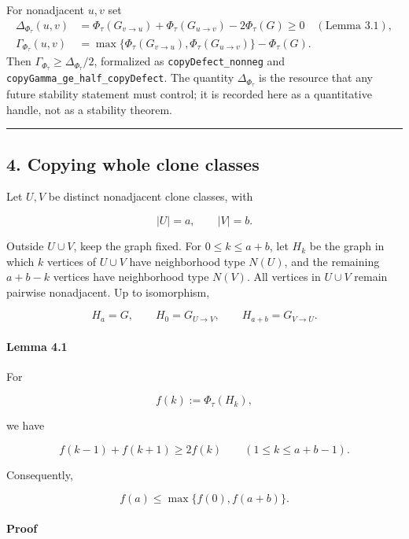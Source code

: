 \documentclass[
  american,
  11pt,
  a4paper,
]{article}
\begin{document}
For nonadjacent \(u,v\) set
\[
\begin{aligned}
\Delta_{\Phi_\tau}(u,v)
&=\Phi_\tau(G_{v\to u})+\Phi_\tau(G_{u\to v})-2\Phi_\tau(G)\ge0
\quad(\text{Lemma 3.1}),\\
\Gamma_{\Phi_\tau}(u,v)
&=\max\{\Phi_\tau(G_{v\to u}),\Phi_\tau(G_{u\to v})\}-\Phi_\tau(G).
\end{aligned}
\]
Then \(\Gamma_{\Phi_\tau}\ge\Delta_{\Phi_\tau}/2\), formalized as \texttt{copyDefect\_nonneg} and \texttt{copyGamma\_ge\_half\_copyDefect}. The quantity \(\Delta_{\Phi_\tau}\) is the resource that any future stability statement must control; it is recorded here as a quantitative handle, not as a stability theorem.

\begin{center}\rule{0.5\linewidth}{0.5pt}\end{center}

\subsection{4. Copying whole clone classes}\label{copying-whole-clone-classes}

Let \(U,V\) be distinct nonadjacent clone classes, with

\[
|U|=a,
\qquad
|V|=b.
\]

Outside \(U\cup V\), keep the graph fixed. For \(0\le k\le a+b\), let \(H_k\) be the graph in which \(k\) vertices of \(U\cup V\) have neighborhood type \(N(U)\), and the remaining \(a+b-k\) vertices have neighborhood type \(N(V)\). All vertices in \(U\cup V\) remain pairwise nonadjacent. Up to isomorphism,

\[
H_a=G,
\qquad
H_0=G_{U\to V},
\qquad
H_{a+b}=G_{V\to U}.
\]

\paragraph{Lemma 4.1}\label{lemma-4.1}

For

\[
f(k):=\Phi_\tau(H_k),
\]

we have

\[
f(k-1)+f(k+1)\ge2f(k)
\qquad
(1\le k\le a+b-1).
\]

Consequently,

\[
f(a)\le\max\{f(0),f(a+b)\}.
\]

\paragraph{Proof}\label{proof-2}
\end{document}
